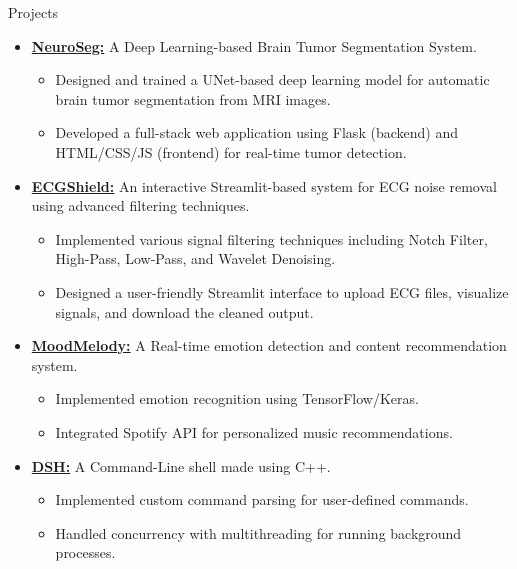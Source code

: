 \documentclass{resume} %
\begin{document}
\begin{rSection}{Projects}
\begin{itemize}\setlength{\itemsep}{-0.5pt}
    \item{\href{https://github.com/mystichronicle/NeuroSeg}{{\bf NeuroSeg:}} 
    A Deep Learning-based Brain Tumor Segmentation System.\vspace{-2pt} 
    \begin{itemize}\setlength{\itemsep}{-6pt}
        \item Designed and trained a UNet-based deep learning model for automatic brain tumor segmentation from MRI images.
        \item Developed a full-stack web application using Flask (backend) and HTML/CSS/JS (frontend) for real-time tumor detection.
    \end{itemize}}
    
    \item{\href{https://github.com/mystichronicle/ECGShield}{{\bf ECGShield:}} 
    An interactive Streamlit-based system for ECG noise removal using advanced filtering techniques.\vspace{-2pt} 
    \begin{itemize}\setlength{\itemsep}{-6pt}
        \item Implemented various signal filtering techniques including Notch Filter, High-Pass, Low-Pass, and Wavelet Denoising.
        \item Designed a user-friendly Streamlit interface to upload ECG files, visualize signals, and download the cleaned output.
    \end{itemize}}

    \item{\href{https://github.com/mystichronicle/MoodMelody}{{\bf MoodMelody:}} 
    A Real-time emotion detection and content recommendation system.\vspace{-2pt} 
    \begin{itemize}\setlength{\itemsep}{-6pt}
        \item Implemented emotion recognition using TensorFlow/Keras.
        \item Integrated Spotify API for personalized music recommendations.
    \end{itemize}}
    
    \item{\href{https://github.com/mystichronicle/dsh}{{\bf DSH:}}
    A Command-Line shell made using C++.\vspace{-2pt} 
    \begin{itemize}\setlength{\itemsep}{-6pt}
        \item Implemented custom command parsing for user-defined commands.
        \item Handled concurrency with multithreading for running background processes.
    \end{itemize}}
    

\end{itemize}
\end{rSection}
\end{document}
